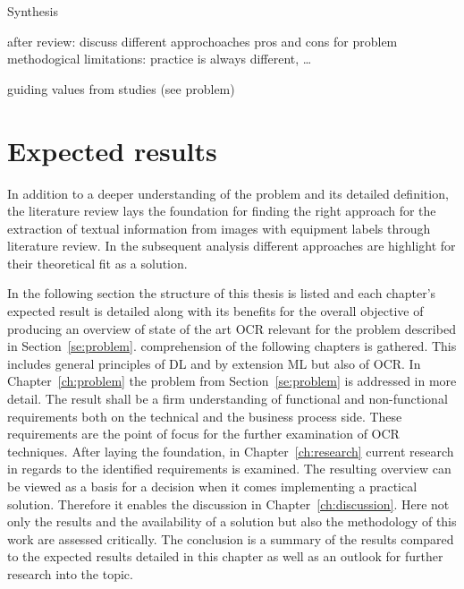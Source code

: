 Synthesis

after review:
discuss different approchoaches pros and cons for problem
methodogical limitations: practice is always different, \ldots


guiding values from studies (see problem)

\section{Expected results}
In addition to a deeper understanding of the problem and its detailed definition, the literature
review lays the foundation for finding the right approach for the extraction of textual
information from images with equipment labels through literature review.
In the subsequent analysis different approaches are highlight for their theoretical fit as a solution.

In the following section the structure of this thesis is listed and each chapter's expected
result is detailed along with its benefits for the overall objective of producing an overview of
state of the art \ac{OCR} relevant for the problem described in Section~\ref{se:problem}.
comprehension of the following chapters is gathered.
This includes general principles of \ac{DL} and by extension \ac{ML} but also of \ac{OCR}.\@
In Chapter~\ref{ch:problem} the problem from Section~\ref{se:problem} is addressed in more detail.
The result shall be a firm understanding of functional and non-functional requirements both on the
technical and the business process side.
These requirements are the point of focus for the further examination of \ac{OCR} techniques.
After laying the foundation, in Chapter~\ref{ch:research} current research in regards to the
identified requirements is examined.
The resulting overview can be viewed as a basis for a decision when it comes implementing a practical
solution.
Therefore it enables the discussion in Chapter~\ref{ch:discussion}.
Here not only the results and the availability of a solution but also the methodology of this work
are assessed critically.
The conclusion is a summary of the results compared to the expected results detailed in this chapter
as well as an outlook for further research into the topic.
